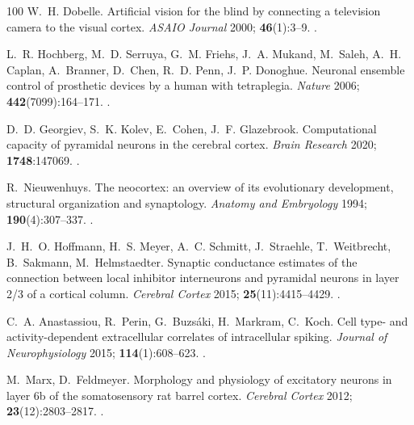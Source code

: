 \documentclass{ws-ijmpb}
\begin{document}
\begin{thebibliography}{100}
W.~H. Dobelle. Artificial vision for the blind by connecting a television
  camera to the visual cortex. \emph{ASAIO Journal} 2000; \textbf{46}(1):3--9.
\newblock \href {http://doi.org/10.1097/00002480-200001000-00002}
  {}.

L.~R. Hochberg, M.~D. Serruya, G.~M. Friehs, J.~A. Mukand, M.~Saleh, A.~H.
  Caplan, A.~Branner, D.~Chen, R.~D. Penn, J.~P. Donoghue. Neuronal ensemble
  control of prosthetic devices by a human with tetraplegia. \emph{Nature}
  2006; \textbf{442}(7099):164--171.
\newblock \href {http://doi.org/10.1038/nature04970}
  {}.

D.~D. Georgiev, S.~K. Kolev, E.~Cohen, J.~F. Glazebrook. Computational capacity
  of pyramidal neurons in the cerebral cortex. \emph{Brain Research} 2020;
  \textbf{1748}:147069.
\newblock \href {http://doi.org/10.1016/j.brainres.2020.147069}
  {}.

R.~Nieuwenhuys. The neocortex: an overview of its evolutionary development,
  structural organization and synaptology. \emph{Anatomy and Embryology} 1994;
  \textbf{190}(4):307--337.
\newblock \href {http://doi.org/10.1007/bf00187291}
  {}.

J.~H.~O. Hoffmann, H.~S. Meyer, A.~C. Schmitt, J.~Straehle, T.~Weitbrecht,
  B.~Sakmann, M.~Helmstaedter. Synaptic conductance estimates of the connection
  between local inhibitor interneurons and pyramidal neurons in layer 2/3 of a
  cortical column. \emph{Cerebral Cortex} 2015; \textbf{25}(11):4415--4429.
\newblock \href {http://doi.org/10.1093/cercor/bhv039}
  {}.

C.~A. Anastassiou, R.~Perin, G.~Buzs\'{a}ki, H.~Markram, C.~Koch. Cell type-
  and activity-dependent extracellular correlates of intracellular spiking.
  \emph{Journal of Neurophysiology} 2015; \textbf{114}(1):608--623.
\newblock \href {http://doi.org/10.1152/jn.00628.2014}
  {}.

M.~Marx, D.~Feldmeyer. Morphology and physiology of excitatory neurons in layer
  6b of the somatosensory rat barrel cortex. \emph{Cerebral Cortex} 2012;
  \textbf{23}(12):2803--2817.
\newblock \href {http://doi.org/10.1093/cercor/bhs254}
  {}.


\end{thebibliography}
\end{document}
